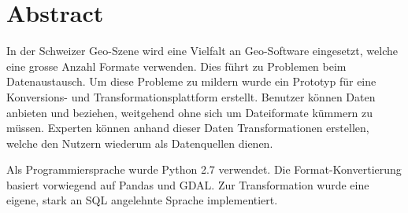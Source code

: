 \begin{comment}
2.1.2 Abstract
Ein Abstract ist eine rein textuelle kurze Zusammenfassung der Arbeit. Der Abstract ist für die Recherche in grossen Dokumentensammlungen geeignet. Er umfasst nie mehr als eine Seite, typisch sogar nur etwa 200 Worte (etwa 20 Zeilen).
Der Begriff ‚Kurzfassung’ ist zuwenig genau definiert; er soll wenn möglich vermieden werden.
\end{comment}


{}
\chapter*{Abstract}
In der Schweizer Geo-Szene wird eine Vielfalt an Geo-Software eingesetzt, welche eine grosse Anzahl Formate verwenden. Dies führt zu Problemen beim Datenaustausch. Um diese Probleme zu mildern wurde ein Prototyp für eine Konversions- und Transformationsplattform erstellt. Benutzer können Daten anbieten und beziehen, weitgehend ohne sich um Dateiformate kümmern zu müssen. Experten können anhand dieser Daten Transformationen erstellen, welche den Nutzern wiederum als Datenquellen dienen.

Als Programmiersprache wurde Python 2.7 verwendet. Die Format-Konvertierung basiert vorwiegend auf Pandas und GDAL. Zur Transformation wurde eine eigene, stark an SQL angelehnte Sprache implementiert.
\glsresetall

